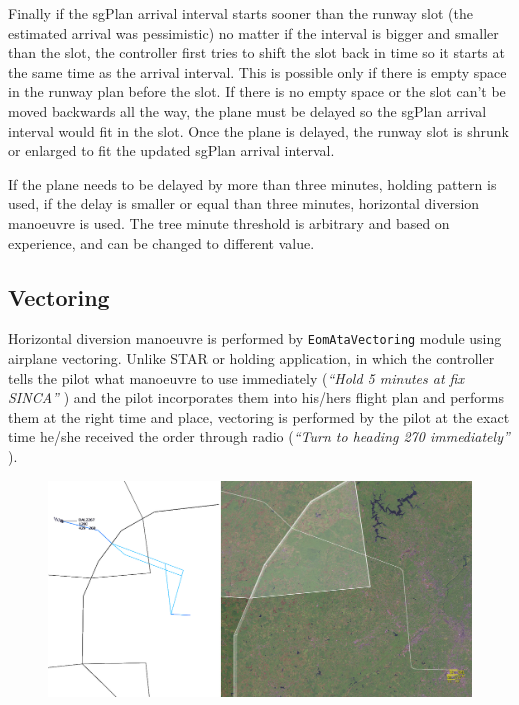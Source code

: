 Finally if the sgPlan arrival interval starts sooner than the runway slot (the estimated arrival was pessimistic) no matter if the interval is bigger and smaller than the slot, the controller first tries to shift the slot back in time so it starts at the same time as the arrival interval. This is possible only if there is empty space in the runway plan before the slot. If there is no empty space or the slot can't be moved backwards all the way, the plane must be delayed so the sgPlan arrival interval would fit in the slot. Once the plane is delayed, the runway slot is shrunk or enlarged to fit the updated sgPlan arrival interval.

If the plane needs to be delayed by more than three minutes, holding pattern is used, if the delay is smaller or equal than three minutes, horizontal diversion manoeuvre is used. The tree minute threshold is arbitrary and based on experience, and can be changed to different value. 

\subsection{Vectoring}

Horizontal diversion manoeuvre is performed by \texttt{EomAtaVectoring} module using airplane vectoring. Unlike STAR or holding application, in which the controller tells the pilot what manoeuvre to use immediately ({\em``Hold 5 minutes at fix SINCA''} ) and the pilot incorporates them into his/hers flight plan and performs them at the right time and place, vectoring is performed by the pilot at the exact time he/she received the order through radio ({\em``Turn to heading 270 immediately''} ).

\begin{figure}[h]
    \centering
    \includegraphics[width=\textwidth]{figures/diversion.png}
    \caption{}
    \label{fig:diversion-implementation}
\end{figure}


